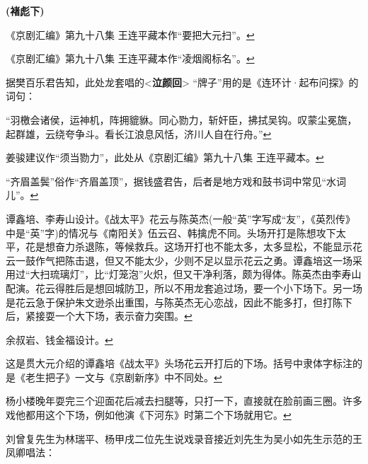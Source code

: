 \textbf{(褚彪下)}


\item
  \leavevmode\hypertarget{fn544}{}%
  《京剧汇编》第九十八集
  王连平藏本作``要把大元扫''。\protect\hyperlink{fnref544}{↩}
\item
  \leavevmode\hypertarget{fn545}{}%
  《京剧汇编》第九十八集
  王连平藏本作``凌烟阁标名''。\protect\hyperlink{fnref545}{↩}
\item
  \leavevmode\hypertarget{fn546}{}%
  据樊百乐君告知，此处龙套唱的\textless{}\textbf{泣颜回}\textgreater{}
  ``牌子''用的是《连环计·起布问探》的词句：

  ``羽檄会诸侯，运神机，阵拥貔貅。同心勠力，斩奸臣，拂拭吴钩。叹蒙尘冕旒，起群雄，云绕夸争斗。看长江浪息风恬，济川人自在行舟。''\protect\hyperlink{fnref546}{↩}
\item
  \leavevmode\hypertarget{fn547}{}%
  姜骏建议作``须当勠力''，此处从《京剧汇编》第九十八集
  王连平藏本。\protect\hyperlink{fnref547}{↩}
\item
  \leavevmode\hypertarget{fn548}{}%
  ``齐眉盖鬓''俗作``齐眉盖顶''，据钱盛君告，后者是地方戏和鼓书词中常见``水词儿''。\protect\hyperlink{fnref548}{↩}
\item
  \leavevmode\hypertarget{fn549}{}%
  谭鑫培、李寿山设计。《战太平》花云与陈英杰(一般``英''字写成``友''，《英烈传》中是``英''字)的情况与《南阳关》伍云召、韩擒虎不同。头场开打是陈想攻下太平，花是想奋力杀退陈，等候救兵。这场开打也不能太多，太多显松，不能显示花云一鼓作气把陈击退，但又不能太少，少则不足以显示花云之勇。谭鑫培这一场采用过``大扫琉璃灯''，比``灯笼泡''火炽，但又干净利落，颇为得体。陈英杰由李寿山配演。花云得胜后是想回城防卫，所以不用龙套追过场，要一个小下场下。另一场是花云急于保护朱文逊杀出重围，与陈英杰无心恋战，因此不能多打，但打陈下后，紧接耍一个大下场，表示奋力突围。\protect\hyperlink{fnref549}{↩}
\item
  \leavevmode\hypertarget{fn550}{}%
  余叔岩、钱金福设计。\protect\hyperlink{fnref550}{↩}
\item
  \leavevmode\hypertarget{fn551}{}%
  这是贯大元介绍的谭鑫培《战太平》头场花云开打后的下场。括号中隶体字标注的是《老生把子》一文与《京剧新序》中不同处。\protect\hyperlink{fnref551}{↩}
\item
  \leavevmode\hypertarget{fn552}{}%
  杨小楼晚年耍完三个迎面花后减去扫腿等，只打一下，直接就在脸前画三圈。许多戏他都用这个下场，例如他演《下河东》时第二个下场就用它。\protect\hyperlink{fnref552}{↩}
\item
  \leavevmode\hypertarget{fn553}{}%
  刘曾复先生为林瑞平、杨甲戌二位先生说戏录音接近刘先生为吴小如先生示范的王凤卿唱法：

